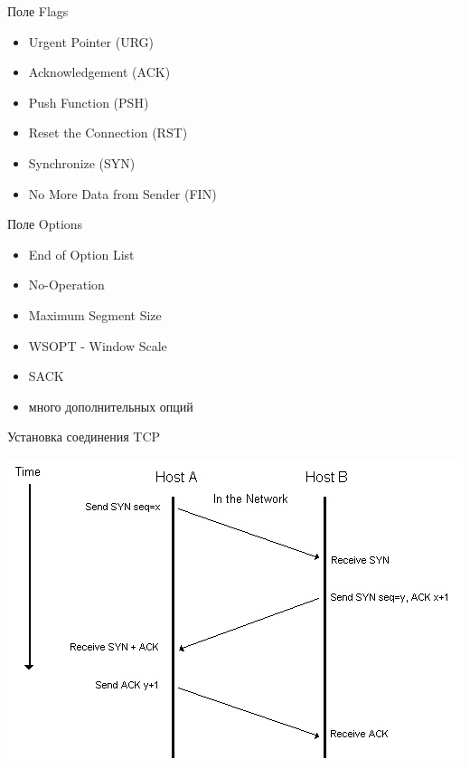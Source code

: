 \begin{frame}{Поле Flags}
	\begin{itemize}
		\item Urgent Pointer (URG)
		\item Acknowledgement (ACK)
		\item Push Function (PSH)
		\item Reset the Connection (RST)
		\item Synchronize (SYN)
		\item No More Data from Sender (FIN)
	\end{itemize}
\end{frame}

\begin{frame}{Поле Options}
	\begin{itemize}
		\item End of Option List
		\item No-Operation
		\item Maximum Segment Size
		\item WSOPT - Window Scale
		\item SACK
		\item много дополнительных опций
	\end{itemize}
\end{frame}


\begin{frame}{Установка соединения TCP}
	\begin{center}
		\includegraphics[height=0.5\textheight]{04-tcp-connection-establishment.png}
	\end{center}
\end{frame}

